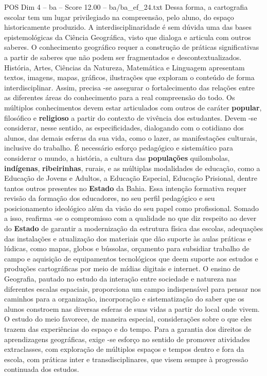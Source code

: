 \begin{textsample}{POS Dim 4 – ba – Score 12.00 – ba/ba\_ef\_24.txt}
Dessa forma, a cartografia escolar tem um lugar privilegiado na compreensão, pelo aluno, do espaço historicamente produzido.
A interdisciplinaridade é sem dúvida uma das bases epistemológicas da Ciência Geográfica, visto que dialoga e articula com outros saberes.
O conhecimento geográfico requer a construção de práticas significativas a partir de saberes que não podem ser fragmentados e descontextualizados.
História, Artes, Ciências da Natureza, Matemática e Linguagem apresentam textos, imagens, mapas, gráficos, ilustrações que exploram o conteúdo de forma interdisciplinar.
Assim, precisa -se assegurar o fortalecimento das relações entre as diferentes áreas do conhecimento para a real compreensão do todo.
Os múltiplos conhecimentos devem estar articulados com outros de caráter \textbf{popular}, filosófico e \textbf{religioso} a partir do contexto de vivência dos estudantes.
Devem -se considerar, nesse sentido, as especificidades, dialogando com o cotidiano dos alunos, das demais esferas da sua vida, como o lazer, as manifestações culturais, inclusive do trabalho.
É necessário esforço pedagógico e sistemático para considerar o mundo, a história, a cultura das \textbf{populações} quilombolas, \textbf{indígenas}, \textbf{ribeirinhas}, rurais, e as múltiplas modalidades de educação, como a Educação de Jovens e Adultos, a Educação Especial, Educação Prisional, dentre tantos outros presentes no \textbf{Estado} da Bahia.
Essa intenção formativa requer revisão da formação dos educadores, no seu perfil pedagógico e seu posicionamento ideológico além da visão do seu papel como profissional.
Somado a isso, reafirma -se o compromisso com a qualidade no que diz respeito ao dever do \textbf{Estado} de garantir a modernização da estrutura física das escolas, adequações das instalações e atualização dos materiais que dão suporte às aulas práticas e lúdicas, como mapas, globos e bússolas, orçamento para subsidiar trabalho de campo e aquisição de equipamentos tecnológicos que deem suporte aos estudos e produções cartográficas por meio de mídias digitais e internet.
O ensino de Geografia, pautado no estudo da interação entre sociedade e natureza nas diferentes escalas espaciais, proporciona um campo indispensável para pensar nos caminhos para a organização, incorporação e sistematização do saber que os alunos constroem nas diversas esferas de suas vidas a partir do local onde vivem.
O estudo do meio favorece, de maneira especial, considerações sobre o que eles trazem das experiências do espaço e do tempo.
Para a garantia dos direitos de aprendizagens geográficas, exige -se esforço no sentido de promover atividades extraclasses, com exploração de múltiplos espaços e tempos dentro e fora da escola, com práticas inter e transdisciplinares, que visem sempre à progressão continuada dos estudos.

\end{textsample}
